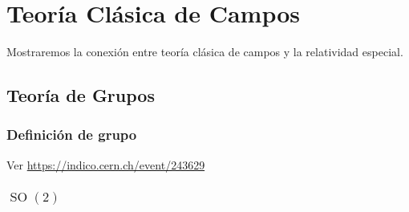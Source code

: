 \chapter{Teoría Clásica de Campos}
\label{chap:tcc} %
Mostraremos la conexión entre teoría clásica de campos y la relatividad
especial.  


\section{Teoría de Grupos}

\subsection{Definición de grupo}
Ver \url{https://indico.cern.ch/event/243629}


\subsection{$\operatorname{SO}(2)$}



